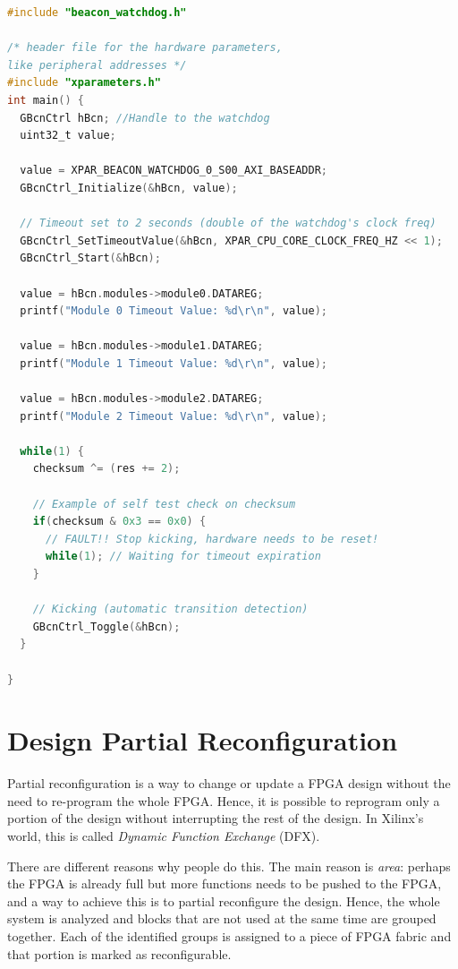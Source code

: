 \begin{lstlisting}[language=C]
#include "beacon_watchdog.h"

/* header file for the hardware parameters, 
like peripheral addresses */
#include "xparameters.h" 
int main() {
  GBcnCtrl hBcn; //Handle to the watchdog
  uint32_t value;

  value = XPAR_BEACON_WATCHDOG_0_S00_AXI_BASEADDR;
  GBcnCtrl_Initialize(&hBcn, value);

  // Timeout set to 2 seconds (double of the watchdog's clock freq)
  GBcnCtrl_SetTimeoutValue(&hBcn, XPAR_CPU_CORE_CLOCK_FREQ_HZ << 1);
  GBcnCtrl_Start(&hBcn);

  value = hBcn.modules->module0.DATAREG;
  printf("Module 0 Timeout Value: %d\r\n", value);

  value = hBcn.modules->module1.DATAREG;
  printf("Module 1 Timeout Value: %d\r\n", value);

  value = hBcn.modules->module2.DATAREG;
  printf("Module 2 Timeout Value: %d\r\n", value);

  while(1) {
    checksum ^= (res += 2);

    // Example of self test check on checksum
    if(checksum & 0x3 == 0x0) {
      // FAULT!! Stop kicking, hardware needs to be reset!
      while(1); // Waiting for timeout expiration
    }

    // Kicking (automatic transition detection)
    GBcnCtrl_Toggle(&hBcn); 
  }

}
\end{lstlisting}



\section{Design Partial Reconfiguration}

Partial reconfiguration is a way to change or update a FPGA design without the need to re-program the whole FPGA. Hence, it is possible to reprogram only a portion of the design without interrupting the rest of the design. In Xilinx's world, this is called \textit{Dynamic Function Exchange} (DFX).\bigskip 

There are different reasons why people do this. The main reason is \textit{area}: perhaps the FPGA is already full but more functions needs to be pushed to the FPGA, and a way to achieve this is to partial reconfigure the design. Hence, the whole system is analyzed and blocks that are not used at the same time are grouped together. Each of the identified groups is assigned to a piece of FPGA fabric and that portion is marked as reconfigurable. 

